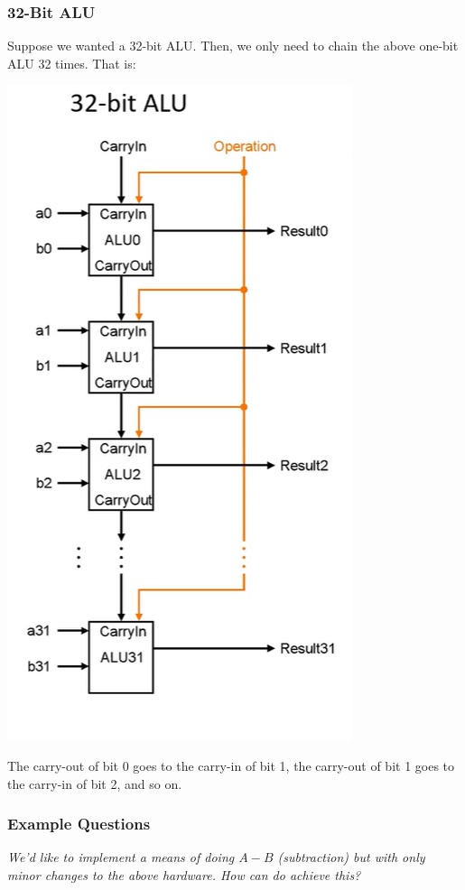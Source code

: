 \documentclass[letterpaper]{article}
\begin{document}
\subsubsection{32-Bit ALU}
Suppose we wanted a 32-bit ALU. Then, we only need to chain the above one-bit ALU 32 times. That is:
\begin{center}
    \includegraphics[scale=0.5]{img/32b_alu.PNG}
\end{center}
The carry-out of bit 0 goes to the carry-in of bit 1, the carry-out of bit 1 goes to the carry-in of bit 2, and so on.

\subsubsection{Example Questions}
\emph{We'd like to implement a means of doing $A - B$ (subtraction) but with only minor changes to the above hardware. How can do achieve this?}
\end{document}
